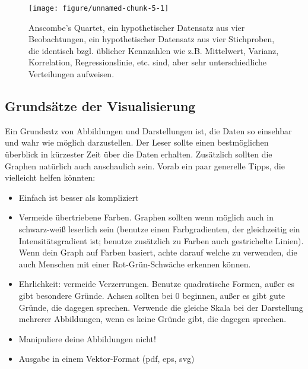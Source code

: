 \documentclass[a4paper,twoside]{tufte-book}\usepackage[]{graphicx}\usepackage[]{color}
\begin{document}
\begin{figure}[htbp]
\begin{center}
\begin{Schunk}

\texttt{[image: figure/unnamed-chunk-5-1]} \end{Schunk}
\caption{Anscombe's Quartet, ein hypothetischer Datensatz aus vier Beobachtungen, ein hypothetischer Datensatz aus vier Stichproben, die identisch bzgl. üblicher Kennzahlen wie z.B. Mittelwert, Varianz, Korrelation, Regressionslinie, etc. sind, aber sehr unterschiedliche Verteilungen aufweisen.}
\label{fig: Anscombes Quartet}
\end{center}
\end{figure}

\subsection{Grundsätze der Visualisierung}

Ein Grundsatz von Abbildungen und Darstellungen ist, die Daten so einsehbar und wahr wie möglich darzustellen. Der Leser sollte einen bestmöglichen überblick in kürzester Zeit über die Daten erhalten. Zusätzlich sollten die Graphen natürlich auch anschaulich sein. Vorab ein paar generelle Tipps, die vielleicht helfen könnten:

\begin{itemize}
\item Einfach ist besser als kompliziert
\item Vermeide übertriebene Farben. Graphen sollten wenn möglich auch in schwarz-weiß leserlich sein (benutze einen Farbgradienten, der gleichzeitig ein Intensitätsgradient ist; benutze zusätzlich zu Farben auch gestrichelte Linien). Wenn dein Graph auf Farben basiert, achte darauf welche zu verwenden, die auch Menschen mit einer Rot-Grün-Schwäche erkennen können.
\item Ehrlichkeit: vermeide Verzerrungen. Benutze quadratische Formen, außer es gibt besondere Gründe. Achsen sollten bei 0 beginnen, außer es gibt gute Gründe, die dagegen sprechen. Verwende die gleiche Skala bei der Darstellung mehrerer Abbildungen, wenn es keine Gründe gibt, die dagegen sprechen. 
\item Manipuliere deine Abbildungen nicht!
\item Ausgabe in einem Vektor-Format (pdf, eps, svg)
\end{itemize}
\end{document}
